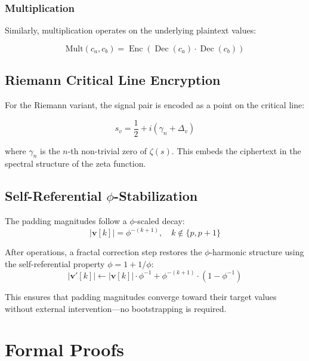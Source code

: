 \documentclass[11pt,a4paper]{article}
\theoremstyle{remark}
\DeclareMathOperator{\Enc}{Enc}
\DeclareMathOperator{\Dec}{Dec}
\begin{document}
\subsubsection{Multiplication}

Similarly, multiplication operates on the underlying plaintext values:

\begin{equation}
    \text{Mult}(c_a, c_b) = \Enc(\Dec(c_a) \cdot \Dec(c_b))
\end{equation}

\subsection{Riemann Critical Line Encryption}

For the Riemann variant, the signal pair is encoded as a point on the critical line:

\begin{equation}
    s_v = \frac{1}{2} + i(\gamma_n + \Delta_v)
\end{equation}

where $\gamma_n$ is the $n$-th non-trivial zero of $\zeta(s)$. This embeds the ciphertext in the spectral structure of the zeta function.

\subsection{Self-Referential $\phi$-Stabilization}

The padding magnitudes follow a $\phi$-scaled decay:
\begin{equation}
    |\mathbf{v}[k]| = \phi^{-(k+1)}, \quad k \notin \{p, p+1\}
\end{equation}

After operations, a fractal correction step restores the $\phi$-harmonic structure using the self-referential property $\phi = 1 + 1/\phi$:
\begin{equation}
    |\mathbf{v}'[k]| \gets |\mathbf{v}[k]| \cdot \phi^{-1} + \phi^{-(k+1)} \cdot (1 - \phi^{-1})
\end{equation}

This ensures that padding magnitudes converge toward their target values without external intervention—no bootstrapping is required.

\section{Formal Proofs}
\end{document}
